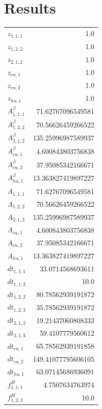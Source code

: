 \documentclass{article}%
\makeatletter
\let\mcnewpage=\newpage%
\newcommand{\TrickSupertabularIntoMulticols}{%
\renewcommand\newpage{%
\if@firstcolumn%
\hrule width\linewidth height0pt%
\columnbreak%
\else%
\mcnewpage%
\fi%
}%
}%
\makeatother
\begin{document}
\section{Results}%
\thispagestyle{plain}%
\begin{multicols*}{3}%
\TrickSupertabularIntoMulticols%
%
\begin{supertabular}{lr}%
	$z_{1,1,1}$ & 1.0 \\%
	$z_{1,2,2}$ & 1.0 \\%
	$z_{2,1,2}$ & 1.0 \\%
	$z_{cu,1}$ & 1.0 \\%
	$z_{cu,2}$ & 1.0 \\%
	$z_{hu,1}$ & 1.0 \\%
	$A_{1,1,1}^{\beta}$ & 71.62767096549581 \\%
	$A_{1,2,2}^{\beta}$ & 70.56626459266522 \\%
	$A_{2,1,2}^{\beta}$ & 135.25996987589937 \\%
	$A_{cu,1}^{\beta}$ & 4.600843803756838 \\%
	$A_{cu,2}^{\beta}$ & 37.95085342166671 \\%
	$A_{hu,1}^{\beta}$ & 13.363827419897227 \\%
	$A_{1,1,1}$ & 71.62767096549581 \\%
	$A_{1,2,2}$ & 70.56626459266522 \\%
	$A_{2,1,2}$ & 135.25996987589937 \\%
	$A_{cu,1}$ & 4.600843803756838 \\%
	$A_{cu,2}$ & 37.95085342166671 \\%
	$A_{hu,1}$ & 13.363827419897227 \\%
	$dt_{1,1,1}$ & 33.0714568693611 \\%
	$dt_{1,1,2}$ & 10.0 \\%
	$dt_{1,2,2}$ & 80.78562939191872 \\%
	$dt_{1,2,3}$ & 35.78562939191872 \\%
	$dt_{2,1,2}$ & 19.21437060808333 \\%
	$dt_{2,1,3}$ & 59.4107779560612 \\%
	$dt_{cu,1}$ & 65.78562939191858 \\%
	$dt_{cu,2}$ & 149.41077795606105 \\%
	$dt_{hu,1}$ & 63.07145686936091 \\%
	$f_{1,1,1}^{H}$ & 4.7507634763974 \\%
	$f_{1,2,2}^{H}$ & 10.0 \\%

\end{supertabular}
\end{multicols*}
\end{document}
